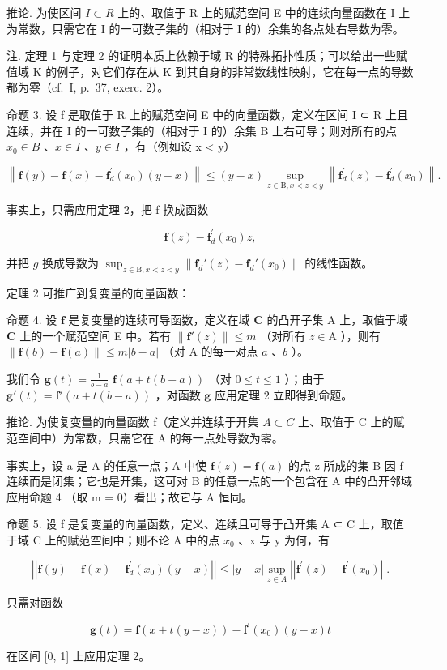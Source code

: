 推论. 为使区间 \(I \subset R\) 上的、取值于 R 上的赋范空间 E 中的连续向量函数在 I 上为常数，只需它在 I 的一可数子集的（相对于 I 的）余集的各点处右导数为零。

注. 定理 1 与定理 2 的证明本质上依赖于域 R 的特殊拓扑性质；可以给出一些赋值域 K 的例子，对它们存在从 K 到其自身的非常数线性映射，它在每一点的导数都为零（cf.~I, p.~37, exerc. 2）。

命题 3. 设 f 是取值于 R 上的赋范空间 E 中的向量函数，定义在区间 I ⊂ R 上且连续，并在 I 的一可数子集的（相对于 I 的）余集 B 上右可导；则对所有的点 \(x_{0} \in B\) 、\(x \in I\) 、\(y \in I\) ，有（例如设 x \textless{} y）

\[
\left\| \mathbf {f} (y) - \mathbf {f} (x) - \mathbf {f} _ {d} ^ {\prime} (x _ {0}) (y - x) \right\| \leqslant (y - x) \sup _ {z \in \mathrm{B}, x <   z <   y} \left\| \mathbf {f} _ {d} ^ {\prime} (z) - \mathbf {f} _ {d} ^ {\prime} (x _ {0}) \right\|.\tag{9}
\]

事实上，只需应用定理 2，把 f 换成函数

\[
\mathbf {f} (z) - \mathbf {f} _ {d} ^ {\prime} (x _ {0}) z,
\]

并把 \(g\) 换成导数为 \(\sup_{z\in \mathrm{B}, x < z < y}\left\| \mathbf{f}_d'(z) - \mathbf{f}_d'(x_0)\right\|\) 的线性函数。

定理 2 可推广到复变量的向量函数：

命题 4. 设 \(\mathbf{f}\) 是复变量的连续可导函数，定义在域 \(\mathbf{C}\) 的凸开子集 A 上，取值于域 \(\mathbf{C}\) 上的一个赋范空间 E 中。若有 \(\| \mathbf{f}'(z)\| \leqslant m\) （对所有 \(z\in \mathrm{A}\) ），则有 \(\| \mathbf{f}(b) - \mathbf{f}(a)\| \leqslant m|b - a|\) （对 A 的每一对点 \(a\) 、\(b\) ）。

我们令 \(\mathbf{g}(t) = \frac{1}{b - a}\) \(\mathbf{f}(a + t(b - a))\) （对 \(0 \leqslant t \leqslant 1\) ）；由于 \(\mathbf{g}'(t) = \mathbf{f}'(a + t(b - a))\) ，对函数 \(\mathbf{g}\) 应用定理 2 立即得到命题。

推论. 为使复变量的向量函数 f（定义并连续于开集 \(A \subset C\) 上、取值于 C 上的赋范空间中）为常数，只需它在 A 的每一点处导数为零。

事实上，设 a 是 A 的任意一点；A 中使 \(\mathbf{f}(z) = \mathbf{f}(a)\) 的点 z 所成的集 B 因 f 连续而是闭集；它也是开集，这可对 B 的任意一点的一个包含在 A 中的凸开邻域应用命题 4 （取 m = 0）看出；故它与 A 恒同。

命题 5. 设 f 是复变量的向量函数，定义、连续且可导于凸开集 A ⊂ C 上，取值于域 C 上的赋范空间中；则不论 A 中的点 \(x_{0}\) 、x 与 y 为何，有

\[
\left| \left| \mathbf {f} (y) - \mathbf {f} (x) - \mathbf {f} _ {d} ^ {\prime} (x _ {0}) (y - x) \right| \right| \leqslant | y - x | \sup _ {z \in A} \left| \left| \mathbf {f} ^ {\prime} (z) - \mathbf {f} ^ {\prime} (x _ {0}) \right| \right|.\tag{10}
\]

只需对函数

\[
\mathbf {g} (t) = \mathbf {f} (x + t (y - x)) - \mathbf {f} ^ {\prime} (x _ {0}) (y - x) t
\]

在区间 {[}0, 1{]} 上应用定理 2。

